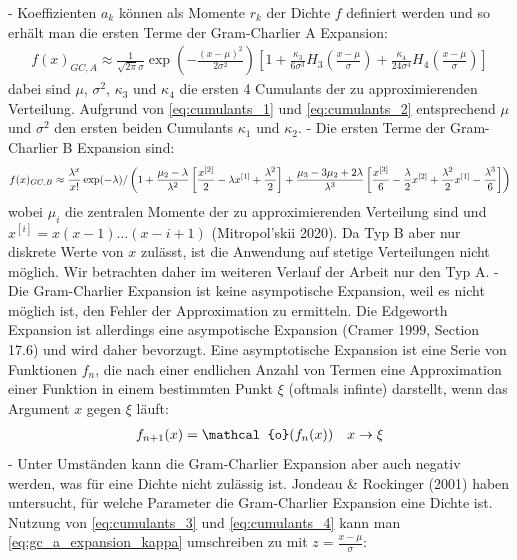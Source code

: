 - Koeffizienten $a_k$ können als Momente $r_k$ der Dichte $f$ definiert werden und so erhält man die ersten Terme der Gram-Charlier A Expansion:
\begin{align}
    \label{eq:gc_a_expansion_kappa}
    f(x)_{GC,A} \approx \frac{1}{\sqrt{2\pi}\sigma}\exp\left(-\frac{(x-\mu)^2}{2\sigma^2}\right) \left[1 + \frac{\kappa_3}{6\sigma^3}H_3\left(\frac{x-\mu}{\sigma}\right) + \frac{\kappa_4}{24\sigma^4}H_4\left(\frac{x-\mu}{\sigma}\right)\right]
\end{align}
dabei sind $\mu$, $\sigma^2$, $\kappa_3$ und $\kappa_4$ die ersten 4 Cumulants der zu approximierenden Verteilung. Aufgrund von \eqref{eq:cumulants_1} und \eqref{eq:cumulants_2} entsprechend $\mu$ und $\sigma^2$ den ersten beiden Cumulants $\kappa_1$ und $\kappa_2$.
- Die ersten Terme der Gram-Charlier B Expansion sind:
\begin{align}
    f(x)_{GC,B} \approx \frac{\lambda^x}{x!}\exp(-\lambda) /\left(1 + \frac{\mu_2 - \lambda}{\lambda^2}\left[\frac{x^{[2]}}{2} - \lambda x^{[1]} + \frac{\lambda^2}{2}\right] + \frac{\mu_3 - 3\mu_2 + 2\lambda}{\lambda^3}\left[\frac{x^{[3]}}{6} - \frac{\lambda}{2}x^{[2]} + \frac{\lambda^2}{2}x^{[1]} - \frac{\lambda^3}{6}\right]\right) \notag
\end{align}
wobei $\mu_i$ die zentralen Momente der zu approximierenden Verteilung sind und $x^{[i]} = x(x-1)\dots (x-i+1)$ (Mitropol'skii 2020). Da Typ B aber nur diskrete Werte von $x$ zulässt, ist die Anwendung auf stetige Verteilungen nicht möglich. Wir betrachten daher im weiteren Verlauf der Arbeit nur den Typ A.
- Die Gram-Charlier Expansion ist keine asympotische Expansion, weil es nicht möglich ist, den Fehler der Approximation zu ermitteln. Die Edgeworth Expansion ist allerdings eine asympotische Expansion (Cramer 1999, Section 17.6) und wird daher bevorzugt. Eine asymptotische Expansion ist eine Serie von Funktionen $f_n$, die nach einer endlichen Anzahl von Termen eine Approximation einer Funktion in einem bestimmten Punkt $\xi$ (oftmals infinte) darstellt, wenn das Argument $x$ gegen $\xi$ läuft:
\begin{align}
    f_{n+1}(x) = \mathcal{o}(f_n(x)) \quad x\to\xi \notag
\end{align}
- Unter Umständen kann die Gram-Charlier Expansion aber auch negativ werden, was für eine Dichte nicht zulässig ist. Jondeau & Rockinger (2001) haben untersucht, für welche Parameter die Gram-Charlier Expansion eine Dichte ist. Nutzung von \eqref{eq:cumulants_3} und \eqref{eq:cumulants_4} kann man \eqref{eq:gc_a_expansion_kappa} umschreiben zu mit $z = \frac{x-\mu}{\sigma}$:
